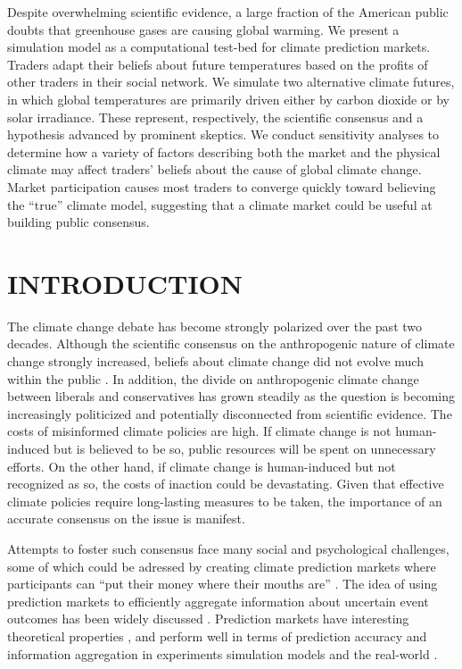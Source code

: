 \documentclass{wscpaperproc}\usepackage[]{graphicx}\usepackage[]{color}
\begin{document}
Despite overwhelming scientific evidence, a large fraction of the American public doubts that greenhouse gases are causing global warming. We present a simulation model as a computational test-bed for climate prediction markets. Traders adapt their beliefs about future temperatures based on the profits of other traders in their social network. We simulate two alternative climate futures, in which global temperatures are primarily driven either by carbon dioxide or by solar irradiance. These represent, respectively, the scientific consensus and a hypothesis advanced by prominent skeptics. We conduct sensitivity analyses to determine how a variety of factors describing both the market and the physical climate may affect traders' beliefs about the cause of global climate change. Market participation causes most traders to converge quickly toward believing the ``true'' climate model, suggesting that a climate market could be useful at building public consensus.

\section{INTRODUCTION}

The climate change debate has become strongly polarized over the past two decades. Although the scientific consensus on the anthropogenic nature of climate change strongly increased, beliefs about climate change did not evolve much within the public . In addition, the divide on anthropogenic climate change between liberals and conservatives has grown steadily as the question is becoming increasingly politicized and potentially disconnected from scientific evidence. The costs of misinformed climate policies are high. If climate change is not human-induced but is believed to be so, public resources will be spent on unnecessary efforts. On the other hand, if climate change is human-induced but not recognized as so, the costs of inaction could be devastating. Given that effective climate policies require long-lasting measures to be taken, the importance of an accurate consensus on the issue is manifest.

Attempts to foster such consensus face many social and psychological challenges, some of which could be adressed by creating climate prediction markets where participants can ``put their money where their mouths are'' . The idea of using prediction markets to efficiently aggregate information about uncertain event outcomes has been widely discussed . Prediction markets have interesting theoretical properties , and perform well in terms of prediction accuracy and information aggregation in experiments  simulation models  and the real-world .
\end{document}
